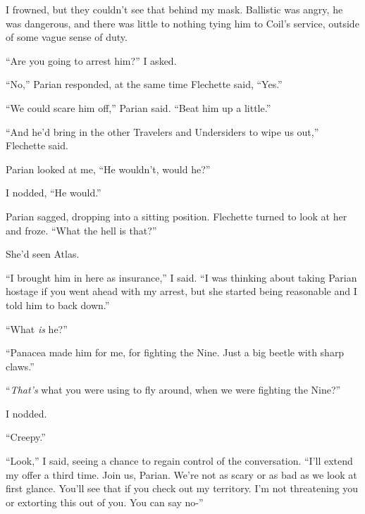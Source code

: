 I frowned, but they couldn't see that behind my mask.  Ballistic was angry, he was dangerous, and there was little to nothing tying him to Coil's service, outside of some vague sense of duty.



``Are you going to arrest him?'' I asked.



``No,'' Parian responded, at the same time Flechette said, ``Yes.''



``We could scare him off,'' Parian said.  ``Beat him up a little.''



``And he'd bring in the other Travelers and Undersiders to wipe us out,'' Flechette said.



Parian looked at me, ``He wouldn't, would he?''



I nodded, ``He would.''



Parian sagged, dropping into a sitting position.  Flechette turned to look at her and froze.  ``What the hell is that?''



She'd seen Atlas.



``I brought him in here as insurance,'' I said.  ``I was thinking about taking Parian hostage if you went ahead with my arrest, but she started being reasonable and I told him to back down.''



``What \emph{is} he?''



``Panacea made him for me, for fighting the Nine.  Just a big beetle with sharp claws.''



``\emph{That's} what you were using to fly around, when we were fighting the Nine?''



I nodded.



``Creepy.''



``Look,'' I said, seeing a chance to regain control of the conversation.  ``I'll extend my offer a third time.  Join us, Parian.  We're not as scary or as bad as we look at first glance.  You'll see that if you check out my territory.  I'm not threatening you or extorting this out of you.  You can say no-''



